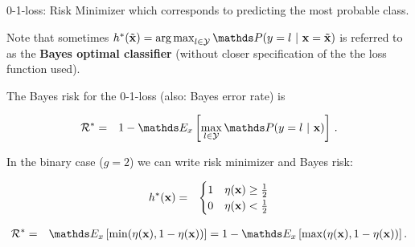 \documentclass[11pt,compress,t,notes=noshow, xcolor=table]{beamer}
\begin{document}
\begin{vbframe}{0-1-loss: Risk Minimizer}
which corresponds to predicting the most probable class. 

\vspace*{0.2cm} 

Note that sometimes $h^{\ast}(\xtil) = \argmax_{l \in \Yspace} \P(y = l~|~ \xv = \xtil)$ is referred to as the \textbf{Bayes optimal classifier} (without closer specification of the the loss function used). 

\lz 

The Bayes risk for the 0-1-loss (also: Bayes error rate) is 

\begin{eqnarray*}  
  \riskbayes &=& 1 - \E_{x} \left[\max_{l \in \Yspace} \P(y = l~|~ \xv)\right]\,.
\end{eqnarray*}

\lz 

In the binary case ($g = 2$) we can write risk minimizer and Bayes risk:  

\begin{eqnarray*}
  h^{\ast}(\mathbf{x}) &=& \begin{cases} 1 & \eta(\mathbf{x}) \ge \frac{1}{2} \\ 0 & \eta(\mathbf{x}) < \frac{1}{2}\end{cases} \\
\end{eqnarray*}

\vspace*{-0.7cm}

\begin{eqnarray*}
  \riskbayes &=& \E_x\left[\min(\eta(\xv), 1 - \eta(\xv))\right] = 1 - \E_x\left[\max(\eta(\xv), 1 - \eta(\xv))\right] . 
\end{eqnarray*}











\end{vbframe}
\end{document}
